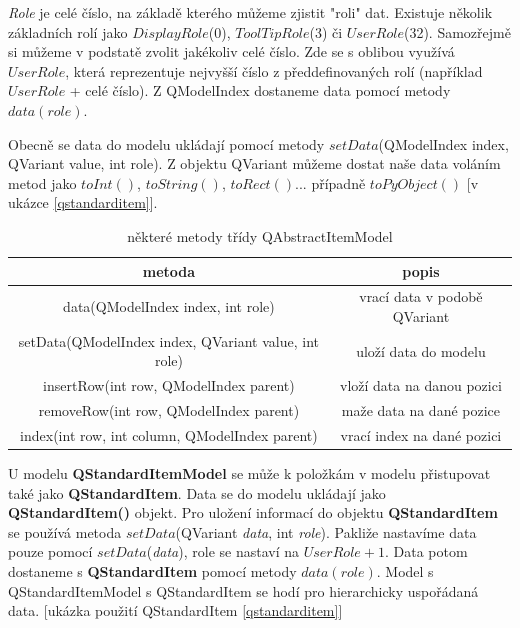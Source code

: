 \textit{Role} je celé číslo, na základě kterého můžeme zjistit "roli" dat. Existuje několik základních rolí jako $DisplayRole$(0), $ToolTipRole$(3) či $UserRole$(32). Samozřejmě si můžeme v podstatě zvolit jakékoliv celé číslo. Zde se s oblibou využívá $UserRole$, která reprezentuje nejvyšší číslo z předdefinovaných rolí (například $UserRole$ + celé číslo). Z QModelIndex dostaneme data pomocí metody $data(role)$.

Obecně se data do modelu ukládají pomocí metody $setData$(QModelIndex index, QVariant value, int role). Z objektu QVariant můžeme dostat naše data voláním metod jako $toInt()$, $toString()$, $toRect()$... případně $toPyObject()$ [v ukázce \ref{qstandarditem}]. 


\begin{table}[h]	
	\centering
	\begin{tabular}{|c|c|}
		\hline	
		metoda & popis \\
		\hline
		\hline
		data(QModelIndex index, int role) & vrací data v podobě QVariant \\
		\hline
		setData(QModelIndex index, QVariant value, int role) & uloží data do modelu \\
		\hline
		insertRow(int row, QModelIndex parent) & vloží data na danou pozici \\
		\hline
		removeRow(int row, QModelIndex parent) & maže data na dané pozice \\
		\hline
		index(int row, int column, QModelIndex parent) & vrací index na dané pozici \\
		\hline


	\end{tabular}
	\caption{některé metody třídy QAbstractItemModel}
	\label{tab:qabsmodel}
\end{table}

U modelu \textbf{QStandardItemModel} se může k položkám v modelu přistupovat také jako \textbf{QStandardItem}. Data se do modelu ukládají jako \textbf{QStandardItem()} objekt. Pro uložení informací do objektu \textbf{QStandardItem} se používá metoda $setData$(QVariant \textit{data}, int \textit{role}). Pakliže nastavíme data pouze pomocí $setData$(\textit{data}), role se nastaví na $UserRole + 1$. Data potom dostaneme s \textbf{QStandardItem} pomocí metody $data(role)$. Model s QStandardItemModel s QStandardItem se hodí pro hierarchicky uspořádaná data. [ukázka použití QStandardItem \ref{qstandarditem}] \\

